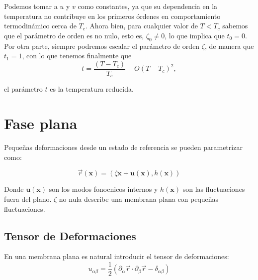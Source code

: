 Podemos tomar a $u$ y $v$ como constantes, ya que su dependencia en la 
temperatura no contribuye en los primeros órdenes en comportamiento
termodinámico cerca de $T_c$. Ahora bien,
para cualquier valor de $T\!<\!T_c$ sabemos que el parámetro de orden es no
nulo, esto es, $\zeta_0\!\neq\! 0$, lo que implica que $t_0=0$. Por otra
parte, siempre podremos escalar el parámetro de orden 
$\zeta$, de manera que $t_1=1$, con lo que tenemos finalmente que
\begin{equation*}
t=\frac{(T-T_c)}{T_c}+O(T-T_c)^2,
\end{equation*}

el parámetro $t$ es la temperatura reducida.


 
\section{Fase plana}

Pequeñas deformaciones desde un estado de referencia se pueden parametrizar
como:

\begin{equation*}
\vec{r}(\mathbf{x})=(\zeta \mathbf{x}+\mathbf{u(\mathbf{x})},h(\mathbf{x}))
\end{equation*}

Donde $\mathbf{u(\mathbf{x})}$ son los modos fonocnicos internos y
$h(\mathbf{x})$ son las fluctuaciones fuera del plano.
$\zeta$ no nula describe una membrana plana con pequeñas fluctuaciones.

\subsection{Tensor de Deformaciones}

En una membrana plana es natural introducir el tensor de deformaciones:
\begin{equation*}
u_{\alpha\beta}=\frac{1}{2}(\partial_{\alpha}\vec{r}\cdot\partial_{\beta}\vec{r}-\delta_{\alpha\beta})
\end{equation*}


